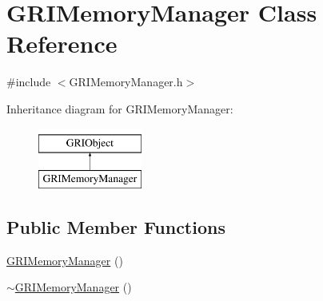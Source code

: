 \hypertarget{classGRIMemoryManager}{\section{\-G\-R\-I\-Memory\-Manager \-Class \-Reference}
\label{classGRIMemoryManager}
}


{\ttfamily \#include $<$\-G\-R\-I\-Memory\-Manager.\-h$>$}

\-Inheritance diagram for \-G\-R\-I\-Memory\-Manager\-:\begin{figure}[H]
\begin{center}
\leavevmode
\includegraphics[height=2.000000cm]{classGRIMemoryManager}
\end{center}
\end{figure}
\subsection*{\-Public \-Member \-Functions}
\begin{DoxyCompactItemize}
\item 
\hyperlink{classGRIMemoryManager_aee93a12f4c62a218ac26a47c12047141}{\-G\-R\-I\-Memory\-Manager} ()
\item 
\hyperlink{classGRIMemoryManager_a067fdc47b1f48b918250e6cfaa880ac6}{$\sim$\-G\-R\-I\-Memory\-Manager} ()
\end{DoxyCompactItemize}
